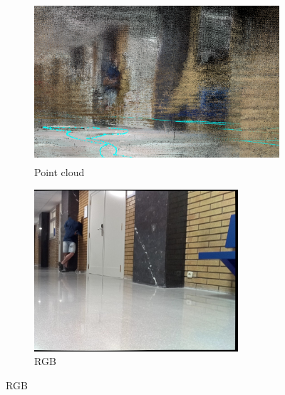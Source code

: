 \begin{figure}[H]
  \centering
  \begin{subfigure}[b]{0.47\textwidth}
    \centering
    \includegraphics[height=6cm,width=\textwidth]{imgs/cc (1).png}
    \caption{Point cloud}

  \end{subfigure}
  \hfill
  \begin{subfigure}[b]{0.47\textwidth}
    \centering
    \includegraphics[height=6cm,width=\textwidth]{imgs/cr1.jpg}
    \caption{RGB}

  \end{subfigure}
\end{figure}

